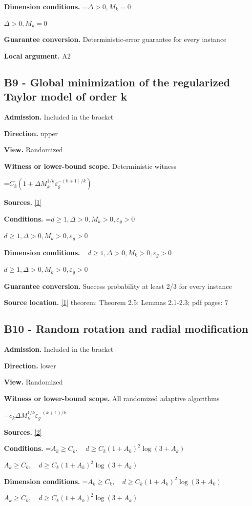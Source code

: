 \documentclass[10pt,a4paper]{article}
\newcommand{\AtlasMath}[1]{\par\begingroup\centering\setbox0=\hbox{$\displaystyle #1$}\ifdim\wd0>1.4\linewidth\typeout{ATLAS WIDE FORMULA: \the\wd0}\fi\ifdim\wd0>\linewidth\resizebox{\linewidth}{!}{\box0}\else\box0\fi\par\endgroup}
\newcommand{\AtlasInlineMath}[1]{\begingroup\setbox0=\hbox{$#1$}\ifdim\wd0>.4\linewidth\endgroup\AtlasMath{#1}\else\endgroup$#1$\fi}
\begin{document}
\textbf{Dimension conditions.} \AtlasInlineMath{\Delta>0, M_k=0}

\textbf{Guarantee conversion.} Deterministic-error guarantee for every instance

\textbf{Local argument.} A2

\subsection{B9 - Global minimization of the regularized Taylor model of order k}
\textbf{Admission.} Included in the bracket

\textbf{Direction.} upper

\textbf{View.} Randomized

\textbf{Witness or lower-bound scope.} Deterministic witness

\AtlasMath{C_k(1+\Delta M_k^{1/k}\varepsilon_g^{-(k+1)/k})}
\textbf{Sources.} \href{https://optimization-online.org/wp-content/uploads/2015/06/4970.pdf}{[1]}

\textbf{Conditions.} \AtlasInlineMath{d\ge 1, \Delta>0, M_k>0, \varepsilon_g>0}

\textbf{Dimension conditions.} \AtlasInlineMath{d\ge 1, \Delta>0, M_k>0, \varepsilon_g>0}

\textbf{Guarantee conversion.} Success probability at least 2/3 for every instance

\textbf{Source location.} \href{https://optimization-online.org/wp-content/uploads/2015/06/4970.pdf}{[1]} theorem: Theorem 2.5; Lemmas 2.1-2.3; pdf pages: 7

\subsection{B10 - Random rotation and radial modification}
\textbf{Admission.} Included in the bracket

\textbf{Direction.} lower

\textbf{View.} Randomized

\textbf{Witness or lower-bound scope.} All randomized adaptive algorithms

\AtlasMath{c_k\Delta M_k^{1/k}\varepsilon_g^{-(k+1)/k}}
\textbf{Sources.} \href{https://arxiv.org/abs/1710.11606}{[2]}

\textbf{Conditions.} \AtlasInlineMath{A_k\ge C_k,\quad d\ge C_k(1+A_k)^2\log(3+A_k)}

\textbf{Dimension conditions.} \AtlasInlineMath{A_k\ge C_k,\quad d\ge C_k(1+A_k)^2\log(3+A_k)}
\end{document}
